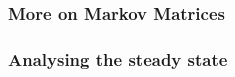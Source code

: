 \documentclass{beamer}
\begin{document}
\begin{frame}[t]\frametitle{More on Markov Matrices}
\end{frame}

\begin{frame}[t]\frametitle{Analysing the steady state}
\end{frame}
\end{document}

